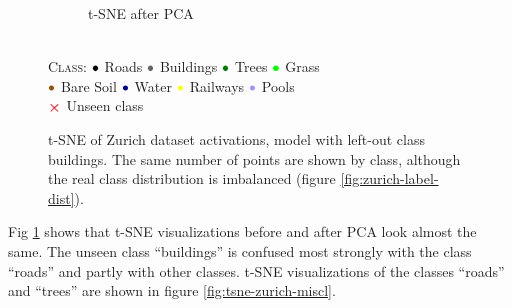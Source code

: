 \documentclass[10pt]{article}
\newcommand{\legendBullet}{
    \textsc{Class}: 
    ${\color{black}\bullet}$ Roads
    ${\color{buildings}\bullet}$ Buildings
    ${\color{trees}\bullet}$ Trees
    ${\color{grass}\bullet}$ Grass\\
    ${\color{baresoil}\bullet}$ Bare Soil
    ${\color{water}\bullet}$ Water
    ${\color{railways}\bullet}$ Railways
    ${\color{swimmingpools}\bullet}$ Pools\\
    ${\color{unseen}\boldsymbol{\times}}$ Unseen class
    }
\begin{document}
\begin{figure}[H]
\begin{subfigure}{.5\textwidth}
        \caption{\gls{t-SNE} after \gls{PCA}}
    \end{subfigure}
    \\[.2cm]
    \legendBullet
    \caption{\gls{t-SNE} of Zurich dataset activations, model with left-out class buildings. The same number of points are shown by class, although the real class distribution is imbalanced (figure \ref{fig:zurich-label-dist}).}
    \label{fig:tsne-zurich}
\end{figure}

Fig \ref{fig:tsne-zurich} shows that \gls{t-SNE} visualizations before and after \gls{PCA} look almost the same. The unseen class ``buildings'' is confused most strongly with the class ``roads'' and partly with other classes. \gls{t-SNE} visualizations of the classes ``roads'' and ``trees''  are shown in figure \ref{fig:tsne-zurich-miscl}.
\end{document}
